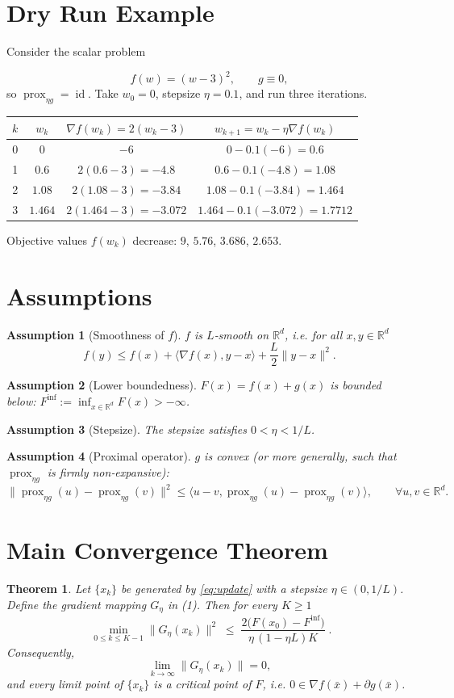 \documentclass{article}
\newtheorem{theorem}{Theorem}
\newtheorem{assumption}{Assumption}
\newcommand{\prox}{\operatorname{prox}}
\newcommand{\grad}{\nabla}
\newcommand{\R}{\mathbb{R}}
\begin{document}
\section*{Dry Run Example}
Consider the scalar problem  

\[
f(w)=(w-3)^{2},\qquad g\equiv0,
\]
so $\prox_{\eta g}= \operatorname{id}$.
Take $w_{0}=0$, stepsize $\eta=0.1$, and run three iterations.

\begin{center}
\begin{tabular}{c|c|c|c}
$k$ & $w_{k}$ & $\grad f(w_{k})=2(w_{k}-3)$ & $w_{k+1}=w_{k}-\eta\grad f(w_{k})$\\\hline
0 & $0$ & $-6$ & $0-0.1(-6)=0.6$\\
1 & $0.6$ & $2(0.6-3)=-4.8$ & $0.6-0.1(-4.8)=1.08$\\
2 & $1.08$ & $2(1.08-3)=-3.84$ & $1.08-0.1(-3.84)=1.464$\\
3 & $1.464$ & $2(1.464-3)=-3.072$ & $1.464-0.1(-3.072)=1.7712$
\end{tabular}
\end{center}
Objective values $f(w_{k})$ decrease: $9$, $5.76$, $3.686$, $2.653$.

\section*{Assumptions}
\begin{assumption}[Smoothness of $f$]\label{as:smooth}
$f$ is $L$‑smooth on $\R^{d}$, i.e. for all $x,y\in\R^{d}$
\[
f(y)\le f(x)+\langle\grad f(x),y-x\rangle+\frac{L}{2}\|y-x\|^{2}.
\tag{2}
\]
\end{assumption}
\begin{assumption}[Lower boundedness]\label{as:lb}
$F(x)=f(x)+g(x)$ is bounded below: $\displaystyle F^{\inf}:=\inf_{x\in\R^{d}}F(x)>-\infty$.
\end{assumption}
\begin{assumption}[Stepsize]\label{as:step}
The stepsize satisfies $0<\eta<1/L$.
\end{assumption}
\begin{assumption}[Proximal operator]\label{as:prox}
$g$ is convex (or more generally, such that $\prox_{\eta g}$ is \emph{firmly non‑expansive}):
\[
\|\prox_{\eta g}(u)-\prox_{\eta g}(v)\|^{2}\le\langle u-v,\prox_{\eta g}(u)-\prox_{\eta g}(v)\rangle,
\qquad\forall u,v\in\R^{d}.
\tag{3}
\]
\end{assumption}

\section*{Main Convergence Theorem}
\begin{theorem}\label{thm:main}
Let $\{x_{k}\}$ be generated by \eqref{eq:update} with a stepsize $\eta\in(0,1/L)$.  
Define the gradient mapping $G_{\eta}$ in (1). Then for every $K\ge1$
\[
\boxed{\;
\min_{0\le k\le K-1}\|G_{\eta}(x_{k})\|^{2}
\;\le\;
\frac{2\bigl(F(x_{0})-F^{\inf}\bigr)}{\eta\,(1-\eta L)K}\; } .
\tag{4}
\]
Consequently,
\[
\lim_{k\to\infty}\|G_{\eta}(x_{k})\|=0,
\]
and every limit point of $\{x_{k}\}$ is a \emph{critical point} of $F$, i.e. $0\in\grad f(\bar x)+\partial g(\bar x)$.
\end{theorem}
\end{document}
